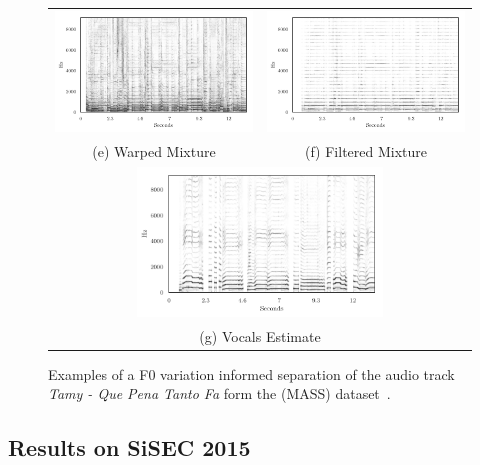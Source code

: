 \begin{figure}
\begin{tabular}{cc}
\includegraphics[width=65mm]{Chapters/05_Separation_Known/warp-demo/warped.pdf} & \includegraphics[width=65mm]{Chapters/05_Separation_Known/warp-demo/warped_filtered.pdf} \\
(e) Warped Mixture & (f) Filtered Mixture \\[6pt]
\multicolumn{2}{c}{\includegraphics[width=65mm]{Chapters/05_Separation_Known/warp-demo/Estimate.pdf} }\\
\multicolumn{2}{c}{(g) Vocals Estimate}
\end{tabular}
\caption{Examples of a F0 variation informed separation of the audio track \emph{Tamy - Que Pena Tanto Fa} form the (MASS) dataset~\cite{MTGMASSdb}.}%
\label{fig:warp_sisec_demo}
\end{figure}

\subsection{Results on SiSEC 2015}
\label{ssec:performance_sisec15}

